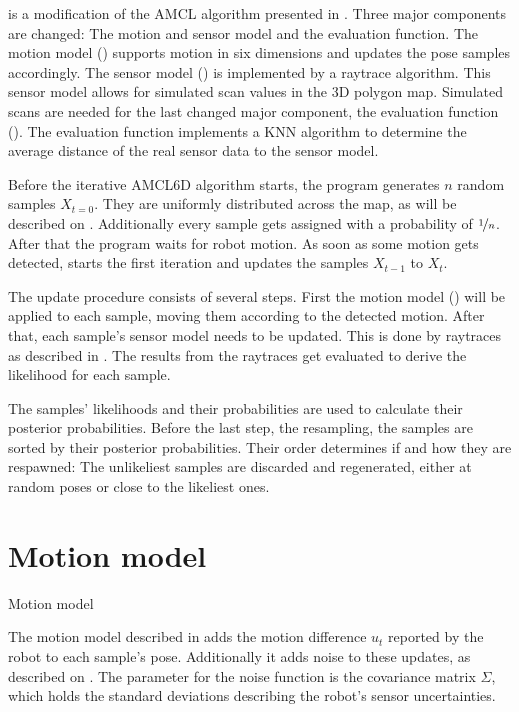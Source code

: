 \documentclass[Thesis.tex]{subfiles}
\begin{document}
%
 is a modification of the \gls{AMCL} algorithm presented in \cite{ThrunBurgardFox:2005}. Three major components are changed: The motion and sensor model and the evaluation function. The motion model () supports motion in six dimensions and updates the pose samples accordingly. The sensor model () is implemented by a raytrace algorithm. This sensor model allows for simulated scan values in the 3D polygon map. Simulated scans are needed for the last changed major component, the evaluation function (). The evaluation function implements a \gls{KNN} algorithm to determine the average distance of the real sensor data to the sensor model.

Before the iterative \gls{AMCL6D} algorithm starts, the program generates $n$ random samples $X_{t=0}$. They are uniformly distributed across the map, as will be described on . Additionally every sample gets assigned with a probability of $\nicefrac{1}{n}$.  After that the program waits for robot motion. As soon as some motion gets detected,  starts the first iteration and updates the samples $X_{t-1}$ to $X_{t}$.

The update procedure consists of several steps. First the motion model () will be applied to each sample, moving them according to the detected motion. After that, each sample's sensor model needs to be updated. This is done by raytraces as described in . The results from the raytraces get evaluated to derive the likelihood for each sample.

The samples' likelihoods and their probabilities are used to calculate their posterior probabilities. Before the last step, the resampling, the samples are sorted by their posterior probabilities. Their order determines if and how they are respawned: The unlikeliest samples are discarded and regenerated, either at random poses or close to the likeliest ones.

\section{Motion model}
%
\begin{algorithm}
\caption{Motion model}
\label{alg:motionmodel}

\end{algorithm}
%
The motion model described in  adds the motion difference $u_{t}$ reported by the robot to each sample's pose. Additionally it adds noise to these updates, as described on . The parameter for the noise function is the covariance matrix $\Sigma$, which holds the standard deviations describing the robot's sensor uncertainties.
\end{document}
